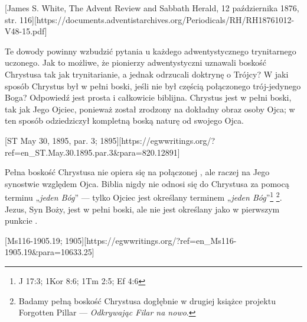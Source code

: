 [James S. White, The Advent Review and Sabbath Herald, 12 października 1876, str. 116][https://documents.adventistarchives.org/Periodicals/RH/RH18761012-V48-15.pdf]

Te dowody powinny wzbudzić pytania u każdego adwentystycznego trynitarnego uczonego. Jak to możliwe, że pionierzy adwentystyczni uznawali boskość Chrystusa tak jak trynitarianie, a jednak odrzucali doktrynę o Trójcy? W jaki sposób Chrystus był w pełni boski, jeśli nie był częścią połączonego trój-jedynego Boga? Odpowiedź jest prosta i całkowicie biblijna. Chrystus jest w pełni boski, tak jak Jego Ojciec, ponieważ został zrodzony na dokładny obraz osoby Ojca; w ten sposób odziedziczył kompletną boską naturę od swojego Ojca.

[ST May 30, 1895, par. 3; 1895][https://egwwritings.org/?ref=en\_ST.May.30.1895.par.3&para=820.12891]

Pełna boskość Chrystusa nie opiera się na połączonej , ale raczej na Jego synostwie względem Ojca. Biblia nigdy nie odnosi się do Chrystusa za pomocą terminu „\textit{jeden Bóg}” — tylko Ojciec jest określany terminem „\textit{jeden Bóg}”\footnote{J 17:3; 1Kor 8:6; 1Tm 2:5; Ef 4:6} \footnote{Badamy pełną boskość Chrystusa dogłębnie w drugiej książce projektu Forgotten Pillar — \textit{Odkrywając Filar na nowo}.}. Jezus, Syn Boży, jest w pełni boski, ale nie jest określany jako  w pierwszym punkcie .

[Ms116-1905.19; 1905][https://egwwritings.org/?ref=en\_Ms116-1905.19&para=10633.25]

